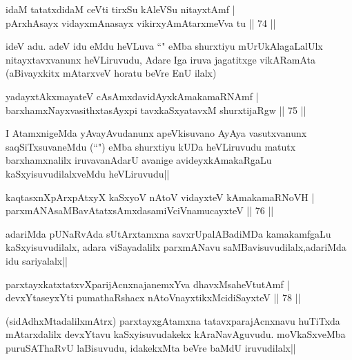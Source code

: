 
\begin{shl}
idaM tatatxdidaM ceVti tirxSu kAleVSu nitayxtAmf |\\
pArxhAsayx vidayxmAnasayx vikirxyAmAtarxmeVva tu \hfill || 74 ||
\end{shl}

\begin{artha}
ideV adu. adeV idu eMdu heVLuva ``\stext" eMba shurxtiyu mUrUkAlagaLalUlx nitayxtavxvanunx heVLiruvudu, Adare Iga iruva jagatitxge vikARamAta (aBivayxkitx mAtarxveV horatu beVre EnU ilalx)
\end{artha}

\begin{shl}
yadayxtAkxmayateV cAsAmxdavidAyxkAmakamaRNAmf |\\
barxhamxNayxvasithxtasAyxpi tavxkaSxyatavxM shurxtijaRgw \hfill || 75 ||
\end{shl}

\begin{artha}
I AtamxnigeMda yAvayAvudanunx apeVkisuvano AyAya vasutxvanunx saqSiTxsuvaneMdu (``\stext") eMba shurxtiyu kUDa heVLiruvudu matutx barxhamxnalilx iruvavanAdarU avanige avideyxkAmakaRgaLu kaSxyisuvudilalxveMdu heVLiruvudu||
\end{artha}


\begin{shl}
kaqtasxnXpArxpAtxyX kaSxyoV nAtoV vidayxteV kAmakamaRNoVH |\\
parxmANAsaMBavAtatxsAmxdasamiVciVnamucayxteV \hfill || 76 ||
\end{shl}

\begin{artha}
adariMda pUNaRvAda sUtArxtamxna savxrUpalABadiMDa kamakamfgaLu kaSxyisuvudilalx, adara viSayadalilx parxmANavu saMBavisuvudilalx,adariMda idu sariyalalx||
\end{artha}


\begin{shl}
parxtayxkatxtatxvXparijAcnxnajanemxYva dhavxMsaheVtutAmf |\\
devxYtaseyxYti pumathaRshacx nAtoV\s nayxtikxMcidiSayxteV \hfill || 78 ||
\end{shl}

\begin{artha}
(sidAdhxMtadalilxmAtrx) parxtayxgAtamxna tatavxparajAcnxnavu huTiTxda mAtarxdalilx devxYtavu kaSxyisuvudakekx kAraNavAguvudu. moVkaSxveMba puruSAThaRvU laBisuvudu, idakekxMta beVre baMdU iruvudilalx||
\end{artha}

